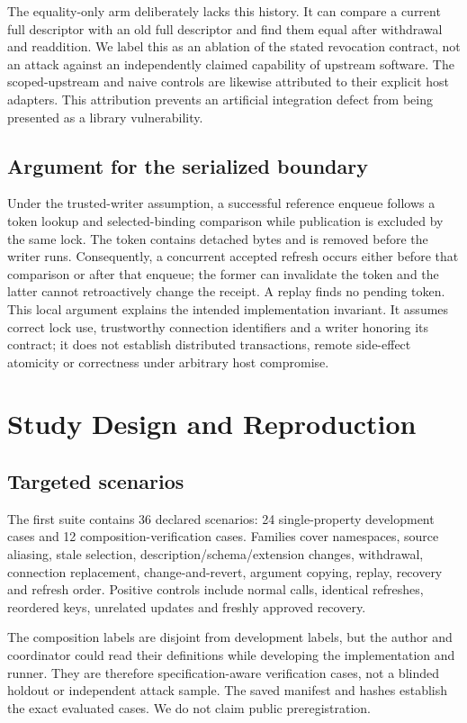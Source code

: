 The equality-only arm deliberately lacks this history. It can compare a current
full descriptor with an old full descriptor and find them equal after withdrawal
and readdition. We label this as an ablation of the stated revocation contract,
not an attack against an independently claimed capability of upstream software.
The scoped-upstream and naive controls are likewise attributed to their explicit
host adapters. This attribution prevents an artificial integration defect from
being presented as a library vulnerability.

\subsection{Argument for the serialized boundary}
Under the trusted-writer assumption, a successful reference enqueue follows a
token lookup and selected-binding comparison while publication is excluded by the
same lock. The token contains detached bytes and is removed before the writer runs.
Consequently, a concurrent accepted refresh occurs either before that comparison
or after that enqueue; the former can invalidate the token and the latter cannot
retroactively change the receipt. A replay finds no pending token. This local
argument explains the intended implementation invariant. It assumes correct lock
use, trustworthy connection identifiers and a writer honoring its contract; it
does not establish distributed transactions, remote side-effect atomicity or
correctness under arbitrary host compromise.

\section{Study Design and Reproduction}
\subsection{Targeted scenarios}
The first suite contains 36 declared scenarios: 24 single-property development
cases and 12 composition-verification cases. Families cover namespaces, source
aliasing, stale selection, description/schema/extension changes, withdrawal,
connection replacement, change-and-revert, argument copying, replay, recovery and
refresh order. Positive controls include normal calls, identical refreshes,
reordered keys, unrelated updates and freshly approved recovery.

The composition labels are disjoint from development labels, but the author and
coordinator could read their definitions while developing the implementation and
runner. They are therefore specification-aware verification cases, not a blinded
holdout or independent attack sample. The saved manifest and hashes establish the
exact evaluated cases. We do not claim public preregistration.

